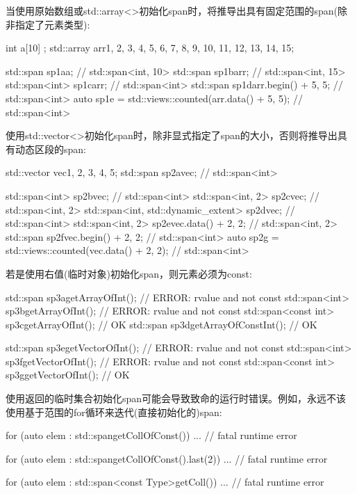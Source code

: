 当使用原始数组或std::array<>初始化span时，将推导出具有固定范围的span(除非指定了元素类型):

\begin{cpp}
int a[10] {};
std::array arr{1, 2, 3, 4, 5, 6, 7, 8, 9, 10, 11, 12, 13, 14, 15};

std::span sp1a{a}; // std::span<int, 10>
std::span sp1b{arr}; // std::span<int, 15>
std::span<int> sp1c{arr}; // std::span<int>
std::span sp1d{arr.begin() + 5, 5}; // std::span<int>
auto sp1e = std::views::counted(arr.data() + 5, 5); // std::span<int>
\end{cpp}

使用std::vector<>初始化span时，除非显式指定了span的大小，否则将推导出具有动态区段的span:

\begin{cpp}
std::vector vec{1, 2, 3, 4, 5};
std::span sp2a{vec}; // std::span<int>

std::span<int> sp2b{vec}; // std::span<int>
std::span<int, 2> sp2c{vec}; // std::span<int, 2>
std::span<int, std::dynamic_extent> sp2d{vec}; // std::span<int>
std::span<int, 2> sp2e{vec.data() + 2, 2}; // std::span<int, 2>
std::span sp2f{vec.begin() + 2, 2}; // std::span<int>
auto sp2g = std::views::counted(vec.data() + 2, 2); // std::span<int>
\end{cpp}

若是使用右值(临时对象)初始化span，则元素必须为const:

\begin{cpp}
std::span sp3a{getArrayOfInt()}; // ERROR: rvalue and not const
std::span<int> sp3b{getArrayOfInt()}; // ERROR: rvalue and not const
std::span<const int> sp3c{getArrayOfInt()}; // OK
std::span sp3d{getArrayOfConstInt()}; // OK

std::span sp3e{getVectorOfInt()}; // ERROR: rvalue and not const
std::span<int> sp3f{getVectorOfInt()}; // ERROR: rvalue and not const
std::span<const int> sp3g{getVectorOfInt()}; // OK
\end{cpp}

使用返回的临时集合初始化span可能会导致致命的运行时错误。例如，永远不该使用基于范围的for循环来迭代(直接初始化的)span:

\begin{cpp}
for (auto elem : std::span{getCollOfConst()}) ... // fatal runtime error

for (auto elem : std::span{getCollOfConst()}.last(2)) ... // fatal runtime error

for (auto elem : std::span<const Type>{getColl()}) ... // fatal runtime error
\end{cpp}

